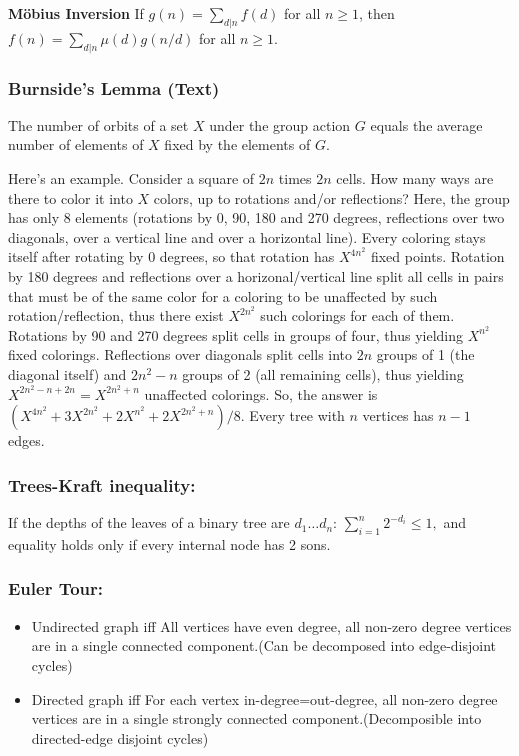 \documentclass[12pt]{extarticle}
\begin{document}
\begin{multicols*}{2}
			\textbf{M\"obius Inversion}
			If $g(n) = \sum_{d|n} f(d)$ for all $n \ge 1$, then
			$f(n) = \sum_{d|n} \mu(d)g(n/d)$ for all $n \ge 1$.
			
			\par\vskip 7pt
			\subsubsection*{Burnside's Lemma (Text)} %
			The number of orbits of a set $X$ under the group action $G$ equals the average
			number of elements of $X$ fixed by the elements of $G$.
			
			Here's an example. Consider a square of $2n$ times $2n$ cells. How many ways
			are there to color it into $X$ colors, up to rotations and/or reflections?
			Here, the group has only 8 elements (rotations by 0, 90, 180 and 270 degrees,
			reflections over two diagonals, over a vertical line and over a horizontal
			line). Every coloring stays itself after rotating by 0 degrees, so that
			rotation has $X^{4n^2}$ fixed points. Rotation by 180 degrees and reflections
			over a horizonal/vertical line split all cells in pairs that must be of the
			same color for a coloring to be unaffected by such rotation/reflection, thus
			there exist $X^{2n^2}$ such colorings for each of them. Rotations by 90 and 270
			degrees split cells in groups of four, thus yielding $X^{n^2}$ fixed colorings.
			Reflections over diagonals split cells into $2n$ groups of 1 (the diagonal
			itself) and $2n^2-n$ groups of 2 (all remaining cells), thus yielding
			$X^{2n^2-n+2n}=X^{2n^2+n}$ unaffected colorings.  So, the answer is
			$(X^{4n^2}+3X^{2n^2}+2X^{n^2}+2X^{2n^2+n})/8$.
			Every tree with $n$ vertices has $n-1$ edges.
			\par\vskip 2pt
			\subsubsection*{Trees-Kraft inequality:}
			If the depths of the leaves of a binary tree are $d_1 \ldots d_n$:
			$
			\sum_{i=1}^n 2^{- d_i} \leq 1,
			$
			and equality holds only if every internal node has 2 sons.
			\par\vskip 2pt
			\subsubsection*{Euler Tour:}
			\begin{itemize}
			\itemsep0em
			\item Undirected graph iff All vertices have even degree, all non-zero degree vertices are in a single connected component.(Can be decomposed into edge-disjoint cycles)
			\item Directed graph iff For each vertex in-degree=out-degree, all non-zero degree vertices are in a single strongly connected component.(Decomposible into directed-edge disjoint cycles)
			\end{itemize}

\end{multicols*}
\end{document}
